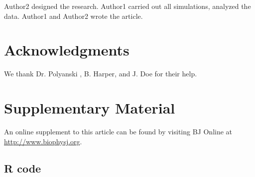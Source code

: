 \documentclass{biophys-new}
\begin{document}
Author2 designed the research. Author1 carried out all simulations, analyzed the data. Author1 and Author2 wrote the article.

\section*{Acknowledgments}

We thank Dr. Polyanski , B. Harper, and J. Doe for their help.




\section*{Supplementary Material}
An online supplement to this article can be found by visiting BJ Online at \url{http://www.biophysj.org}.

\subsection*{R code}
\end{document}
